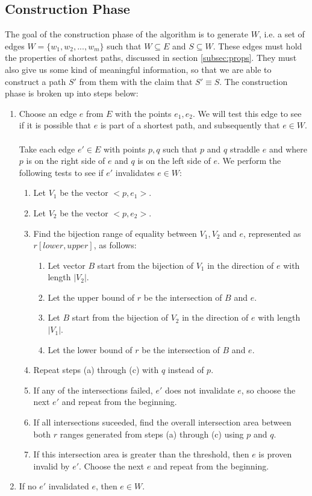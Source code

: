 \documentclass[12pt]{article}
\begin{document}
\subsection{Construction Phase}\label{subsec:construct}
The goal of the construction phase of the algorithm is to generate $W$, i.e. a set of
edges $W = \{w_1, w_2, ..., w_m\}$ such that $W \subseteq E$ and $S \subseteq W$.
These edges must hold the properties of shortest paths, discussed in section
\ref{subsec:props}.
They must also give us some kind of meaningful information, so that we are able to
construct a path $S'$ from them with the claim that $S' \equiv S$.
The construction phase is broken up into steps below:
\begin{enumerate}
\item Choose an edge $e$ from $E$ with the points $e_1,e_2$.
We will test this edge to see if it is possible that $e$ is part of a shortest path,
and subsequently that $e \in W$.
\\\\
Take each edge $e' \in E$ with points $p,q$ such that $p$ and $q$ straddle
$e$ and where $p$ is on the right side
of $e$ and $q$ is on the left side of $e$.
We perform the following tests to see if $e'$ invalidates $e \in W$:
\begin{enumerate}
\item Let $V_1$ be the vector $<p,e_1>$.
\item Let $V_2$ be the vector $<p,e_2>$.
\item Find the bijection range of equality between $V_1,V_2$ and $e$,
represented as $r[lower, upper]$, as follows:
\begin{enumerate}
\item Let vector $B$ start from the bijection of $V_1$
in the direction of $e$ with length $|V_2|$.
\item Let the upper bound of $r$ be the intersection of $B$ and $e$.
\item Let $B$ start from the bijection of $V_2$
in the direction of $e$ with length $|V_1|$.
\item Let the lower bound of $r$ be the intersection of $B$ and $e$.
\end{enumerate}
\item Repeat steps (a) through (c) with $q$ instead of $p$.
\item If any of the intersections failed, $e'$ does not invalidate $e$,
so choose the next $e'$ and repeat from the beginning.
\item If all intersections suceeded, find the overall intersection area between
both $r$ ranges generated from steps (a) through (c) using $p$ and $q$.
\item If this intersection area is greater than the threshold, then $e$ is proven
invalid by $e'$. Choose the next $e$ and repeat from the beginning.
\end{enumerate}
\item If no $e'$ invalidated $e$, then $e \in W$.
\end{enumerate}
\end{document}
